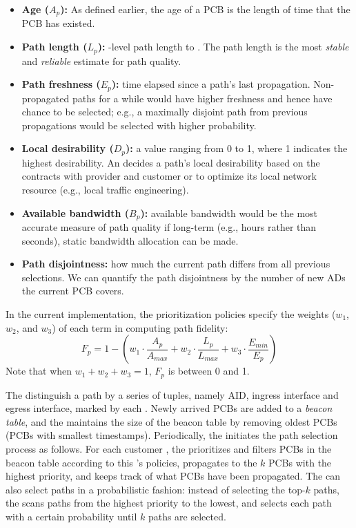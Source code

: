 \begin{itemize}
\item {\bf Age ($A_p$):} As defined earlier, the age of a PCB is the
  length of time that the PCB has existed.
\item {\bf Path length ($L_p$):} \AD-level path length to \ISDC. The
  path length is the most {\em stable} and {\em reliable} estimate for
  path quality.
\item {\bf Path freshness ($E_p$):} time elapsed since a path's last
  propagation. Non-propagated paths for a while would have higher
  freshness and hence have chance to be selected; e.g., a maximally
  disjoint path from previous propagations would be selected with
  higher probability.
\item {\bf Local desirability ($D_p$):} a value ranging from 0 to 1,
  where 1 indicates the highest desirability. An \AD decides a path's
  local desirability based on the contracts with provider and customer
  \ADs or to optimize its local network resource (e.g., local traffic
  engineering).
\item {\bf Available bandwidth ($B_p$):} available bandwidth would be
  the most accurate measure of path quality if long-term (e.g., hours
  rather than seconds), static bandwidth allocation can be made.
\item {\bf Path disjointness:} how much the current path differs from
  all previous selections. We can quantify the path disjointness by
  the number of new ADs the current PCB covers.
\end{itemize}

In the current implementation, the prioritization policies specify the
weights ($w_1$, $w_2$, and $w_3$) of each term in computing path
fidelity:
\[
F_p = 1 - (w_1 \cdot \frac{A_p}{A_{max}} + w_2 \cdot \frac{L_p}{L_{max}} + w_3 \cdot \frac{E_{min}}{E_{p}})
\]
Note that when $w_1 + w_2 + w_3 = 1$, $F_p$ is between 0 and 1.


The \BS distinguish a path by a series of tuples, namely AID, ingress
interface and egress interface, marked by each \AD. Newly arrived PCBs
are added to a {\em beacon table}, and the \BS maintains the size of
the beacon table by removing oldest PCBs (PCBs with smallest
timestamps).    Periodically, the \BS initiates the path
selection process as follows. For each customer \AD, the \BS
prioritizes and filters PCBs in the beacon table according to this
\AD's policies, propagates to the \AD $k$ PCBs with the highest
priority, and keeps track of what PCBs have been propagated. The \BS
can also select paths in a probabilistic fashion: instead of selecting
the top-$k$ paths, the \BS scans paths from the highest priority to
the lowest, and selects each path with a certain probability until $k$
paths are selected.


